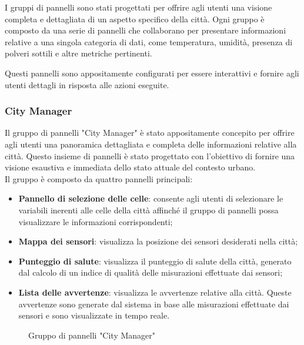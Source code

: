 I gruppi di pannelli sono stati progettati per offrire agli utenti una visione completa e dettagliata di un aspetto specifico della città. Ogni gruppo è composto da una serie di pannelli che collaborano per presentare informazioni relative a una singola categoria di dati, come temperatura, umidità, presenza di polveri sottili e altre metriche pertinenti. 

Questi pannelli sono appositamente configurati per essere interattivi e fornire agli utenti dettagli in risposta alle azioni eseguite.
\\
\subsubsection{City Manager}
Il gruppo di pannelli "City Manager" è stato appositamente concepito per offrire agli utenti una panoramica dettagliata e completa delle informazioni relative alla città. Questo insieme di pannelli è stato progettato con l'obiettivo di fornire una visione esaustiva e immediata dello stato attuale del contesto urbano.\\
Il gruppo è composto da quattro pannelli principali:
\begin{itemize}
    \item \textbf{Pannello di selezione delle celle}: consente agli utenti di selezionare le variabili inerenti alle celle della città affinché il gruppo di pannelli possa visualizzare le informazioni corrispondenti;
    \item \textbf{Mappa dei sensori}: visualizza la posizione dei sensori desiderati nella città;
    \item \textbf{Punteggio di salute}: visualizza il punteggio di salute della città, generato dal calcolo di un indice di qualità delle misurazioni effettuate dai sensori;
    \item \textbf{Lista delle avvertenze}: visualizza le avvertenze relative alla città. Queste avvertenze sono generate dal sistema in base alle misurazioni effettuate dai sensori e sono visualizzate in tempo reale.
\end{itemize}
\begin{figure}[H]
    \centering
    \caption{Gruppo di pannelli "City Manager"}
    \label{fig:my_label}
\end{figure}


